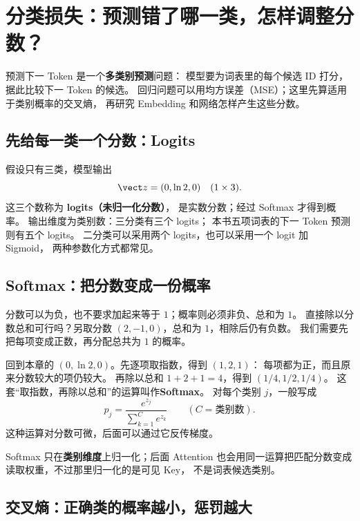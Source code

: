 \chapterrule
\section{分类损失：预测错了哪一类，怎样调整分数？}
\label{intro:20c-classification-loss}

预测下一 Token 是一个\textbf{多类别预测}问题：
模型要为词表里的每个候选 ID 打分，据此比较下一 Token 的候选。
回归问题可以用均方误差（MSE）；这里先算适用于类别概率的交叉熵，
再研究 Embedding 和网络怎样产生这些分数。

\subsection{先给每一类一个分数：Logits}
\label{concept:logits}

假设只有三类，模型输出
\[
\vect z=(0,\ln 2,0)\quad(1\times3).
\]
这三个数称为 \textbf{logits（未归一化分数）}，
是实数分数；经过 Softmax 才得到概率。
输出维度为类别数：三分类有三个 logits；
本书五项词表的下一 Token 预测则有五个 logits。
二分类可以采用两个 logits，也可以采用一个 logit 加 Sigmoid，
两种参数化方式都常见。

\subsection{Softmax：把分数变成一份概率}
\label{concept:softmax}

分数可以为负，也不要求加起来等于 $1$；概率则必须非负、总和为 $1$。
直接除以分数总和可行吗？另取分数 $(2,-1,0)$，总和为 $1$，相除后仍有负数。
我们需要先把每项变成正数，再分配总共为 $1$ 的概率。

回到本章的 $(0,\ln2,0)$。先逐项取指数，得到 $(1,2,1)$：
每项都为正，而且原来分数较大的项仍较大。
再除以总和 $1+2+1=4$，得到 $(1/4,1/2,1/4)$。
这套“取指数，再除以总和”的运算叫作\textbf{Softmax}。
对每个类别 $j$，一般写成
\begin{equation}
\boxed{p_j=\frac{e^{z_j}}{\sum_{k=1}^{C}e^{z_k}}}\qquad
(C=\text{类别数}).
\label{eq:early-class-softmax}
\end{equation}
这种运算对分数可微，后面可以通过它反传梯度。


Softmax 只在\textbf{类别维度}上归一化；后面 Attention
也会用同一运算把匹配分数变成读取权重，不过那里归一化的是可见 Key，
不是词表候选类别。


\subsection{交叉熵：正确类的概率越小，惩罚越大}
\label{concept:cross-entropy}


